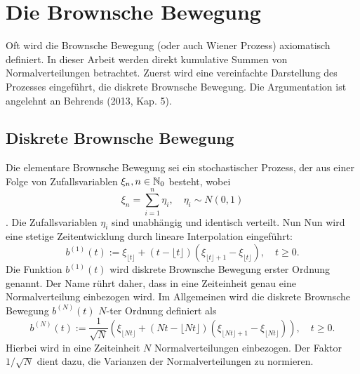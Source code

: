 \section{Die Brownsche Bewegung}

Oft wird die Brownsche Bewegung (oder auch Wiener Prozess) axiomatisch definiert. In dieser Arbeit werden 
direkt kumulative Summen von Normalverteilungen betrachtet. Zuerst wird eine vereinfachte Darstellung des Prozesses eingeführt, 
die diskrete Brownsche Bewegung. Die Argumentation ist angelehnt an Behrends \cite{behrends} (2013, Kap. 5).

\subsection{Diskrete Brownsche Bewegung}

\begin{defi}
Die elementare Brownsche Bewegung sei ein stochastischer Prozess, 
der aus einer Folge von Zufallsvariablen $\xi_n, n \in \Bbb N_0$ besteht, wobei
$$\xi_n = \sum_{i=1}^n \eta_i, \quad \eta_i \sim N(0,1)$$. 
Die Zufallsvariablen $\eta_i$ sind unabhängig und identisch verteilt. Nun 
Nun wird eine stetige Zeitentwicklung durch lineare Interpolation eingeführt:
$$b^{(1)}(t) := \xi_{\lfloor t \rfloor} + (t - \lfloor t \rfloor)(\xi_{\lfloor t \rfloor + 1} - \xi_{\lfloor t \rfloor}), \quad t \geq 0.$$
Die Funktion $b^{(1)}(t)$ wird diskrete Brownsche Bewegung erster Ordnung genannt.
Der Name rührt daher, dass in eine Zeiteinheit genau eine Normalverteilung einbezogen wird.
Im Allgemeinen wird die diskrete Brownsche Bewegung $b^{(N)}(t)$ $N$-ter Ordnung definiert als
$$b^{(N)}(t) := \frac{1}{\sqrt{N}} \left ( \xi_{\lfloor Nt \rfloor} + (Nt - \lfloor Nt \rfloor)(\xi_{\lfloor Nt \rfloor + 1} - \xi_{\lfloor Nt \rfloor}) \right ), \quad t \geq 0.$$
Hierbei wird in eine Zeiteinheit $N$ Normalverteilungen einbezogen. Der Faktor $1/\sqrt{N}$ dient dazu, die Varianzen der Normalverteilungen zu normieren.

\end{defi}

